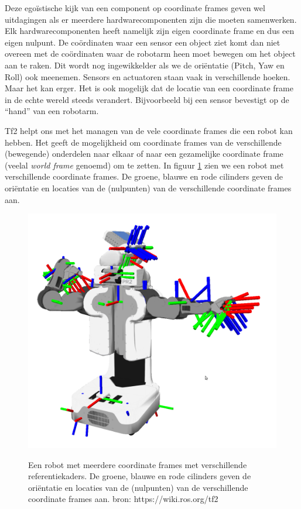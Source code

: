 Deze egoïstische kijk van een component op coordinate frames geven wel uitdagingen als er meerdere hardwarecomponenten zijn die moeten samenwerken. Elk hardwarecomponenten heeft namelijk zijn eigen coordinate frame en dus een eigen nulpunt. De coördinaten waar een sensor een object ziet komt dan niet overeen met de coördinaten waar de robotarm heen moet bewegen om het object aan te raken. Dit wordt nog ingewikkelder als we de oriëntatie (Pitch, Yaw en Roll) ook meenemen. Sensors en actuatoren staan vaak in verschillende hoeken. Maar het kan erger. Het is ook mogelijk dat de locatie van een coordinate frame in de echte wereld steeds verandert. Bijvoorbeeld bij een sensor bevestigt op de ``hand'' van een robotarm.

Tf2 helpt ons met het managen van de vele coordinate frames die een robot kan hebben. Het geeft de mogelijkheid om coordinate frames van de verschillende (bewegende) onderdelen naar elkaar of naar een gezamelijke coordinate frame (veelal \textit{world frame} genoemd) om te zetten. In figuur \ref{fig:coordinateframes} zien we een robot met verschillende coordinate frames. De groene, blauwe en rode cilinders  geven de oriëntatie en locaties van de (nulpunten) van de verschillende coordinate frames aan.

\begin{figure}[ht]
\begin{center}
\includegraphics[scale=0.2]{Pictures/robot_multiple_coordinatesystems.png}\\
\end{center}
\caption{Een robot met meerdere coordinate frames met verschillende referentiekaders. De groene, blauwe en rode cilinders  geven de oriëntatie en locaties van de (nulpunten) van de verschillende coordinate frames aan. \tiny{bron: https://wiki.ros.org/tf2}}
\label{fig:coordinateframes}
\end{figure}

